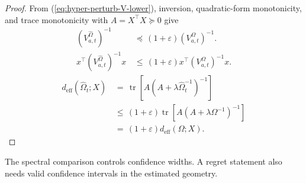 \documentclass{article} %
\renewcommand{\eqref}[1]{\textup{(\ref{#1})}}
\begin{document}
\begin{proof}
From \eqref{eq:hyper-perturb-V-lower}, inversion, quadratic-form monotonicity,
and trace monotonicity with \(A=X^\top X\succeq0\) give
\begin{equation}
\label{eq:hyper-perturb-width-proof-qf}
\begin{aligned}
\left(V_{a,t}^{\widehat{\Omega}}\right)^{-1}
&\,\preceq\,
(1+\varepsilon)
\left(V_{a,t}^{\Omega}\right)^{-1}.
\\
x^\top
\left(V_{a,t}^{\widehat{\Omega}}\right)^{-1}
x
&\,\leq\,
(1+\varepsilon)
x^\top
\left(V_{a,t}^{\Omega}\right)^{-1}
x .
\end{aligned}
\end{equation}
\begin{equation}
\label{eq:hyper-perturb-deff-proof}
\begin{aligned}
d_{\mathrm{eff}}(\widehat{\Omega}_t;X)
&\,=\,
\operatorname{tr}
\!\left[
A
\left(
A+\lambda\widehat{\Omega}_t^{-1}
\right)^{-1}
\right]
\\
&\,\leq\,
(1+\varepsilon)
\operatorname{tr}
\!\left[
A
\left(
A+\lambda\Omega^{-1}
\right)^{-1}
\right]
\\
&\,=\,
(1+\varepsilon)
d_{\mathrm{eff}}(\Omega;X).
\end{aligned}
\end{equation}
\end{proof}

The spectral comparison controls confidence widths. A regret statement also
needs valid confidence intervals in the estimated geometry.
\end{document}
